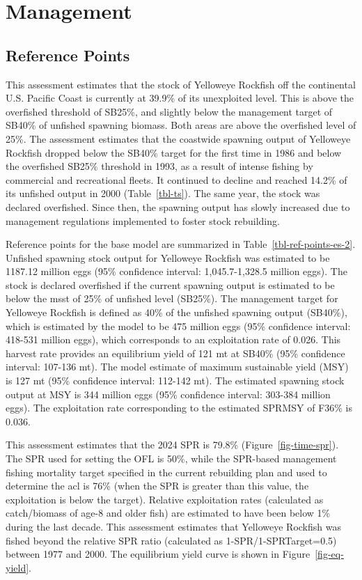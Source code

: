 \documentclass[
]{scrartcl}
\begin{document}
\section{Management}\label{management}

\subsection{Reference Points}\label{reference-points-1}

This assessment estimates that the stock of Yelloweye Rockfish off the
continental U.S. Pacific Coast is currently at 39.9\% of its unexploited
level. This is above the overfished threshold of SB25\%, and slightly
below the management target of SB40\% of unfished spawning biomass. Both
areas are above the overfished level of 25\%. The assessment estimates
that the coastwide spawning output of Yelloweye Rockfish dropped below
the SB40\% target for the first time in 1986 and below the overfished
SB25\% threshold in 1993, as a result of intense fishing by commercial
and recreational fleets. It continued to decline and reached 14.2\% of
its unfished output in 2000 (Table~\ref{tbl-ts}). The same year, the
stock was declared overfished. Since then, the spawning output has
slowly increased due to management regulations implemented to foster
stock rebuilding.

Reference points for the base model are summarized in
Table~\ref{tbl-ref-points-es-2}. Unfished spawning stock output for
Yelloweye Rockfish was estimated to be 1187.12 million eggs (95\%
confidence interval: 1,045.7-1,328.5 million eggs). The stock is
declared overfished if the current spawning output is estimated to be
below the \gls{msst} of 25\% of unfished level (SB25\%). The management
target for Yelloweye Rockfish is defined as 40\% of the unfished
spawning output (SB40\%), which is estimated by the model to be 475
million eggs (95\% confidence interval: 418-531 million eggs), which
corresponds to an exploitation rate of 0.026. This harvest rate provides
an equilibrium yield of 121 mt at SB40\% (95\% confidence interval:
107-136 mt). The model estimate of maximum sustainable yield (MSY) is
127 mt (95\% confidence interval: 112-142 mt). The estimated spawning
stock output at MSY is 344 million eggs (95\% confidence interval:
303-384 million eggs). The exploitation rate corresponding to the
estimated SPRMSY of F36\% is 0.036.

This assessment estimates that the 2024 SPR is 79.8\%
(Figure~\ref{fig-time-spr}). The SPR used for setting the OFL is 50\%,
while the SPR-based management fishing mortality target specified in the
current rebuilding plan and used to determine the \gls{acl} is 76\%
(when the SPR is greater than this value, the exploitation is below the
target). Relative exploitation rates (calculated as catch/biomass of
age-8 and older fish) are estimated to have been below 1\% during the
last decade. This assessment estimates that Yelloweye Rockfish was
fished beyond the relative SPR ratio (calculated as
1-SPR/1-SPRTarget=0.5) between 1977 and 2000. The equilibrium yield
curve is shown in Figure~\ref{fig-eq-yield}.
\end{document}
